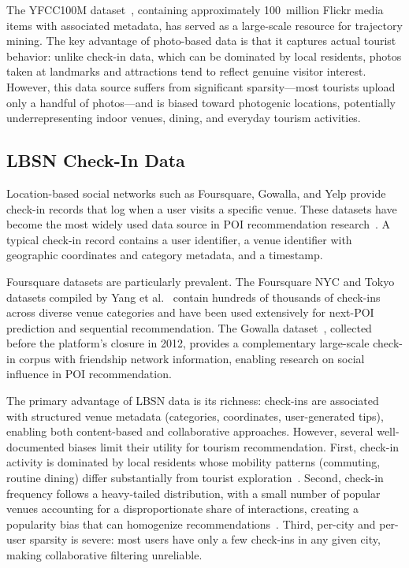 The YFCC100M dataset~\cite{thomee2016yfcc}, containing approximately 100~million Flickr media items with associated metadata, has served as a large-scale resource for trajectory mining. The key advantage of photo-based data is that it captures actual tourist behavior: unlike check-in data, which can be dominated by local residents, photos taken at landmarks and attractions tend to reflect genuine visitor interest. However, this data source suffers from significant sparsity---most tourists upload only a handful of photos---and is biased toward photogenic locations, potentially underrepresenting indoor venues, dining, and everyday tourism activities.

\subsection{LBSN Check-In Data}
\label{sec:sota-data-lbsn}

Location-based social networks such as Foursquare, Gowalla, and Yelp provide check-in records that log when a user visits a specific venue. These datasets have become the most widely used data source in POI recommendation research~\cite{werneck2021poi, islam2022deep}. A typical check-in record contains a user identifier, a venue identifier with geographic coordinates and category metadata, and a timestamp.

Foursquare datasets are particularly prevalent. The Foursquare NYC and Tokyo datasets compiled by Yang et al.~\cite{yang2015foursquare} contain hundreds of thousands of check-ins across diverse venue categories and have been used extensively for next-POI prediction and sequential recommendation. The Gowalla dataset~\cite{cho2011gowalla}, collected before the platform's closure in 2012, provides a complementary large-scale check-in corpus with friendship network information, enabling research on social influence in POI recommendation.

The primary advantage of LBSN data is its richness: check-ins are associated with structured venue metadata (categories, coordinates, user-generated tips), enabling both content-based and collaborative approaches. However, several well-documented biases limit their utility for tourism recommendation. First, check-in activity is dominated by local residents whose mobility patterns (commuting, routine dining) differ substantially from tourist exploration~\cite{lim2018survey}. Second, check-in frequency follows a heavy-tailed distribution, with a small number of popular venues accounting for a disproportionate share of interactions, creating a popularity bias that can homogenize recommendations~\cite{werneck2021poi}. Third, per-city and per-user sparsity is severe: most users have only a few check-ins in any given city, making collaborative filtering unreliable.

